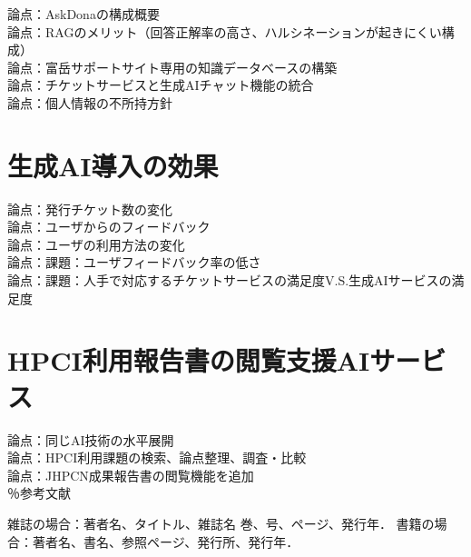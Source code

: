 \documentclass{jsaxiesproc}
\begin{document}
論点：AskDonaの構成概要\\
論点：RAGのメリット（回答正解率の高さ、ハルシネーションが起きにくい構成）\\
論点：富岳サポートサイト専用の知識データベースの構築\\
論点：チケットサービスと生成AIチャット機能の統合\\
論点：個人情報の不所持方針\\


\section{生成AI導入の効果}

論点：発行チケット数の変化\\
論点：ユーザからのフィードバック\\
論点：ユーザの利用方法の変化\\
論点：課題：ユーザフィードバック率の低さ\\
論点：課題：人手で対応するチケットサービスの満足度V.S.生成AIサービスの満足度\\


\section{HPCI利用報告書の閲覧支援AIサービス}
論点：同じAI技術の水平展開\\
論点：HPCI利用課題の検索、論点整理、調査・比較\\
論点：JHPCN成果報告書の閲覧機能を追加\\


％参考文献
\begin{thebibliography}{99}
	 雑誌の場合：著者名、タイトル、雑誌名 巻、号、ページ、発行年．
	 書籍の場合：著者名、書名、参照ページ、発行所、発行年．
\end{thebibliography}
\end{document}
